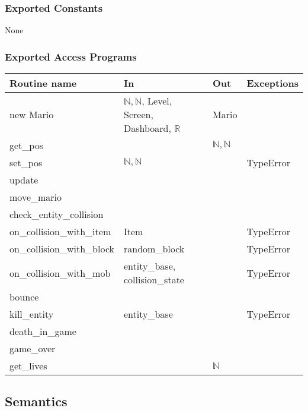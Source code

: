 \documentclass[12pt]{article}
\begin{document}
\subsubsection*{Exported Constants}
None
\subsubsection*{Exported Access Programs}
\begin{tabular}{| l | l | l | p{5cm} |}
\hline
\textbf{Routine name} & \textbf{In} & \textbf{Out} & \textbf{Exceptions}\\
\hline
new Mario & $\mathbb{N}, \mathbb{N}$, Level, Screen, Dashboard, $\mathbb{R}$ & Mario & \\
\hline
get\_pos & & $\mathbb{N}, \mathbb{N}$ &\\
\hline
set\_pos & $\mathbb{N}, \mathbb{N}$ & & TypeError\\
\hline
update & & &\\
\hline
move\_mario & & & \\
\hline
check\_entity\_collision & & &\\
\hline
on\_collision\_with\_item & Item & & TypeError\\
\hline
on\_collision\_with\_block & random\_block & & TypeError\\
\hline
on\_collision\_with\_mob & entity\_base, collision\_state & & TypeError\\
\hline
bounce & & &\\
\hline
kill\_entity & entity\_base & & TypeError\\
\hline
death\_in\_game & & &\\
\hline
game\_over & & &\\
\hline
get\_lives & & $\mathbb{N}$ &\\
\hline
\end{tabular}

\subsection*{Semantics}
\end{document}
